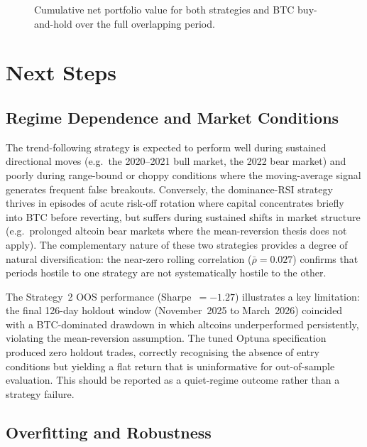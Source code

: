 \documentclass[11pt,a4paper]{article}
\begin{document}
\begin{figure}[H]
  \centering
  \caption{Cumulative net portfolio value for both strategies and BTC buy-and-hold over the full overlapping period.}
  \label{fig:combined-equity}
\end{figure}


\section{Next Steps}
\label{sec:next-steps}

\subsection{Regime Dependence and Market Conditions}

The trend-following strategy is expected to perform well during sustained directional moves (e.g.\ the 2020--2021 bull market, the 2022 bear market) and poorly during range-bound or choppy conditions where the moving-average signal generates frequent false breakouts.  Conversely, the dominance-RSI strategy thrives in episodes of acute risk-off rotation where capital concentrates briefly into BTC before reverting, but suffers during sustained shifts in market structure (e.g.\ prolonged altcoin bear markets where the mean-reversion thesis does not apply).  The complementary nature of these two strategies provides a degree of natural diversification: the near-zero rolling correlation ($\bar{\rho} = 0.027$) confirms that periods hostile to one strategy are not systematically hostile to the other.

The Strategy~2 OOS performance (Sharpe~$= -1.27$) illustrates a key limitation: the final 126-day holdout window (November~2025 to March~2026) coincided with a BTC-dominated drawdown in which altcoins underperformed persistently, violating the mean-reversion assumption.  The tuned Optuna specification produced zero holdout trades, correctly recognising the absence of entry conditions but yielding a flat return that is uninformative for out-of-sample evaluation.  This should be reported as a quiet-regime outcome rather than a strategy failure.

\subsection{Overfitting and Robustness}
\end{document}
